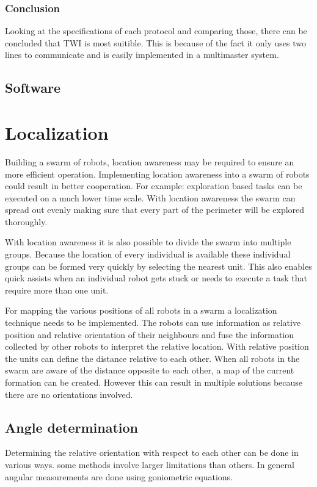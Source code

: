 \documentclass[10pt,a4paper]{article}
\begin{document}
\subsubsection{Conclusion}
Looking at the specifications of each protocol and comparing those, there can be concluded that TWI is most suitible. This is because of the fact it only uses two lines to communicate and is easily implemented in a multimaster system.


\subsection{Software}


\newpage
\section{Localization}
Building a swarm of robots, location awareness may be required to ensure an more efficient operation. Implementing location awareness into a swarm of robots could result in better cooperation. For example: exploration based tasks can be executed on a much lower time scale. With location awareness the swarm can spread out evenly making sure that every part of the perimeter will be explored thoroughly. 

With location awareness it is also possible to divide the swarm into multiple groups. Because the location of every individual is available these individual groups can be formed very quickly by selecting the nearest unit. This also enables quick assists when an individual robot gets stuck or needs to execute a task that require more than one unit.

For mapping the various positions of all robots in a swarm a localization technique needs to be implemented. The robots can use information as relative position and relative orientation of their neighbours and fuse the information collected by other robots to interpret the relative location. With relative position the units can define the distance relative to each other. When all robots in the swarm are aware of the distance opposite to each other, a map of the current formation can be created. However this can result in multiple solutions because there are no orientations involved. 

\subsection{Angle determination}
Determining the relative orientation with respect to each other can be done in various ways. some methods involve larger limitations than others. In general angular measurements are done using goniometric equations.
\end{document}
